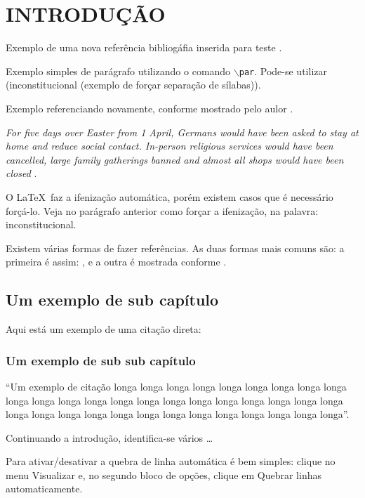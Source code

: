 \chapter{INTRODUÇÃO}

\par Exemplo de uma nova referência bibliogáfia inserida para teste \cite{grafosRoberto2013}.


\par Exemplo simples de parágrafo utilizando o comando \texttt{$\backslash$par}. Pode-se utilizar (in\-cons\-titucional (exemplo de forçar separação de sílabas)).

\par Exemplo referenciando novamente, conforme mostrado pelo aulor .

\begin{citacao}
\textit{For five days over Easter from 1 April, Germans would have been asked to stay at home and reduce social contact. In-person religious services would have been cancelled, large family gatherings banned and almost all shops would have been closed} \cite{noticiaAlemanhaBBC}.
\end{citacao}

\par O \LaTeX~faz a ifenização automática, porém existem casos que é necessário forçá-lo. Veja no parágrafo anterior como forçar a ifenização, na palavra: inconstitucional.

\par Existem várias formas de fazer referências. As duas formas mais comuns são: a primeira é assim: , e a outra é mostrada conforme \cite{ecocentro}.


\section{Um exemplo de sub capítulo}


\par Aqui está um exemplo de uma citação direta:

\subsection{Um exemplo de sub sub capítulo}

\begin{citacao}
``Um exemplo de citação longa longa longa longa longa longa longa longa longa longa longa longa longa longa longa longa longa longa longa longa longa longa longa longa longa longa longa longa longa longa longa longa longa longa longa''. \cite{gadotti2003boniteza}
\end{citacao}

\par Continuando a introdução, identifica-se vários \ldots

\par Para ativar/desativar a quebra de linha automática é bem simples: clique no menu Visualizar e, no segundo bloco de opções, clique em Quebrar linhas automaticamente.


